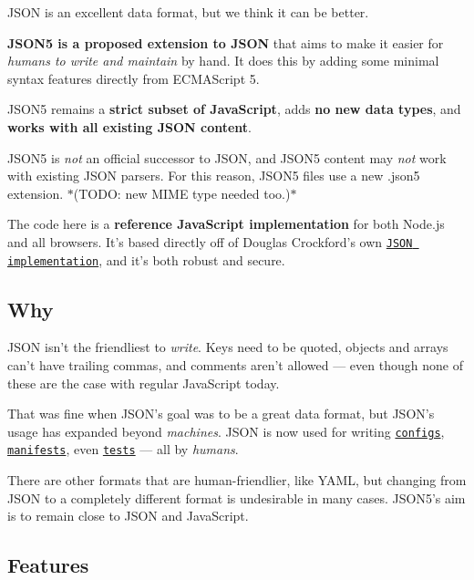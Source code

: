 \href{https://travis-ci.org/json5/json5}{\tt }

J\+S\+ON is an excellent data format, but we think it can be better.

{\bfseries J\+S\+O\+N5 is a proposed extension to J\+S\+ON} that aims to make it easier for {\itshape humans to write and maintain} by hand. It does this by adding some minimal syntax features directly from E\+C\+M\+A\+Script 5.

J\+S\+O\+N5 remains a {\bfseries strict subset of Java\+Script}, adds {\bfseries no new data types}, and {\bfseries works with all existing J\+S\+ON content}.

J\+S\+O\+N5 is {\itshape not} an official successor to J\+S\+ON, and J\+S\+O\+N5 content may {\itshape not} work with existing J\+S\+ON parsers. For this reason, J\+S\+O\+N5 files use a new .json5 extension. $\ast$(T\+O\+DO\+: new M\+I\+ME type needed too.)$\ast$

The code here is a {\bfseries reference Java\+Script implementation} for both Node.\+js and all browsers. It’s based directly off of Douglas Crockford’s own \href{https://github.com/douglascrockford/JSON-js/blob/master/json_parse.js}{\tt J\+S\+ON implementation}, and it’s both robust and secure.

\subsection*{Why}

J\+S\+ON isn’t the friendliest to {\itshape write}. Keys need to be quoted, objects and arrays can’t have trailing commas, and comments aren’t allowed — even though none of these are the case with regular Java\+Script today.

That was fine when J\+S\+O\+N’s goal was to be a great data format, but J\+S\+O\+N’s usage has expanded beyond {\itshape machines}. J\+S\+ON is now used for writing \href{http://plovr.com/docs.html}{\tt configs}, \href{https://www.npmjs.org/doc/files/package.json.html}{\tt manifests}, even \href{http://code.google.com/p/fuzztester/wiki/JSONFileFormat}{\tt tests} — all by {\itshape humans}.

There are other formats that are human-\/friendlier, like Y\+A\+ML, but changing from J\+S\+ON to a completely different format is undesirable in many cases. J\+S\+O\+N5’s aim is to remain close to J\+S\+ON and Java\+Script.

\subsection*{Features}

